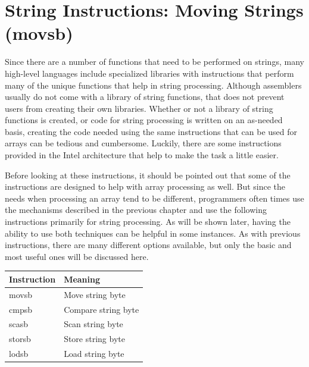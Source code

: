 \documentclass[10pt]{book}
\begin{document}
\section{String Instructions: Moving Strings (movsb)}
Since there are a number of functions that need to be performed on strings, many high-level languages include specialized libraries with instructions that perform many of the unique functions that help in string processing. Although assemblers usually do not come with a library of string functions, that does not prevent users from creating their own libraries. Whether or not a library of string functions is created, or code for string processing is written on an as-needed basis, creating the code needed using the same instructions that can be used for arrays can be tedious and cumbersome. Luckily, there are some instructions provided in the Intel architecture that help to make the task a little easier.

Before looking at these instructions, it should be pointed out that some of the instructions are designed to help with array processing as well. But since the needs when processing an array tend to be different, programmers often times use the mechanisms described in the previous chapter and use the following instructions primarily for string processing. As will be shown later, having the ability to use both techniques can be helpful in some instances. As with previous instructions, there are many different options available, but only the basic and most useful ones will be discussed here.

\begin{center}
\begin{tabular}{|l|l|}
\hline
Instruction & Meaning \\
\hline
movsb & Move string byte \\
\hline
cmpsb & Compare string byte \\
\hline
scasb & Scan string byte \\
\hline
storsb & Store string byte \\
\hline
lodsb & Load string byte \\
\hline
\end{tabular}
\end{center}
\end{document}
